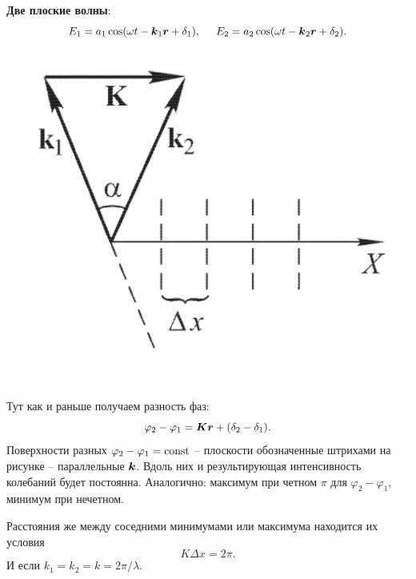 \textbf{Две плоские волны}:
\begin{equation*}
	E_1 = a_1 \cos (\omega t - \mbox{\boldmath $k$}_1  \mbox{\boldmath $r$} + \delta_1),
	\hspace{0.5 cm}
	E_2 = a_2 \cos (\omega t - \mbox{\boldmath $k$}_2  \mbox{\boldmath $r$} + \delta_2).
\end{equation*}


\begin{minipage}{0.35\textwidth}
    \includegraphics[width=1\textwidth]{figures/s26_1.png}
\end{minipage}
\hfill
\begin{minipage}{0.55\textwidth}
	Тут как и раньше получаем разность фаз:
	\begin{equation*}
		\varphi_2 - \varphi_1 = \mbox{\boldmath $K$} \mbox{\boldmath $r$} + (\delta_2 - \delta_1).
	\end{equation*}    
	Поверхности разных $\varphi_2 - \varphi_1 = \text{const}$ -- плоскости обозначенные штрихами на рисунке -- параллельные $\mbox{\boldmath $k$}$. Вдоль них и результирующая интенсивность колебаний будет постоянна.
	Аналогично: максимум при четном $\pi$ для $\varphi_2 - \varphi_1$, минимум при нечетном.

	Расстояния же между соседними минимумами или максимума находится их условия
\begin{equation*}
	K \Delta x = 2 \pi.
\end{equation*}
И если $k_1 = k_2 = k = 2\pi/\lambda$. 
\end{minipage}

